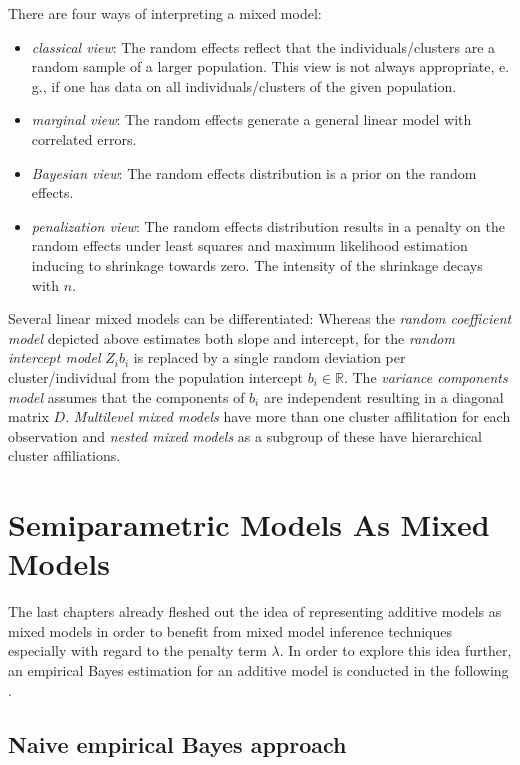 \documentclass[12pt]{article}
\begin{document}
There are four ways of interpreting a mixed model:
\begin{itemize}
\item \textit{classical view}: The random effects reflect that the individuals/clusters are a random sample of a larger population. This view is not always appropriate, e.\,g., if one has data on all individuals/clusters of the given population.
\item \textit{marginal view}: The random effects generate a general linear
model with correlated errors.
\item \textit{Bayesian view}: The random effects distribution is a prior on the random effects.
\item \textit{penalization view}: The random effects distribution results in a penalty on the random effects under least squares and maximum likelihood estimation inducing to shrinkage towards zero. The intensity of the shrinkage decays with $n$.
\end{itemize}


Several linear mixed models can be differentiated:
Whereas the \textit{random coefficient model} depicted above estimates both slope and intercept, for the \textit{random intercept model} $Z_ib_i$ is replaced by a single random deviation per cluster/individual from the population intercept $b_i \in \mathbb{R}$. The \textit{variance components model} assumes that the components of $b_i$ are independent resulting in a diagonal matrix $D$.
\textit{Multilevel mixed models} have more than one cluster affilitation for each observation and \textit{nested mixed models} as a subgroup of these have hierarchical cluster affiliations.


\section{Semiparametric Models As Mixed Models}\label{representation} %


The last chapters already fleshed out the idea of representing additive models as mixed models in order to benefit from mixed model inference techniques especially with regard to the penalty term $\lambda$. In order to explore this idea further, an empirical Bayes estimation for an additive model is conducted in the following \cite{kneib2006mixed}. 

\subsection{Naive empirical Bayes approach}
\end{document}
